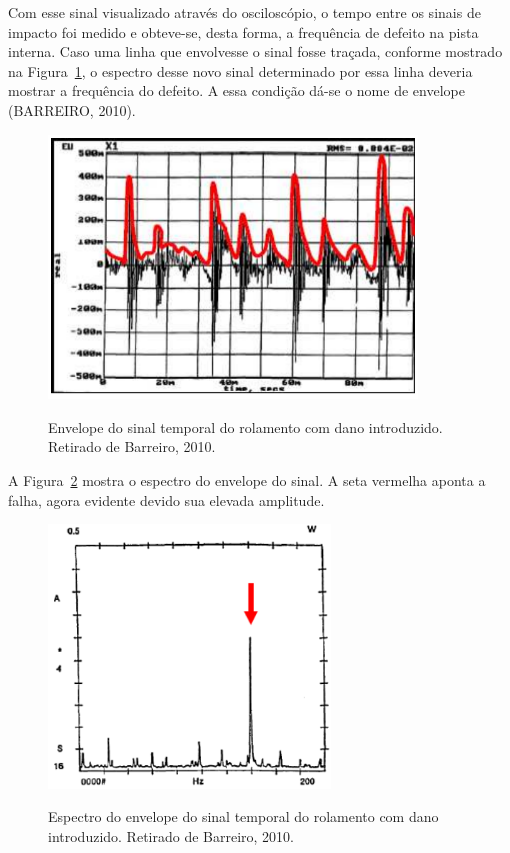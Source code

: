 \documentclass[
	12pt,				
	oneside,			
	a4paper,			
	english,			
	brazil,			
	]{abntex2ppgsi}
\begin{document}
Com esse sinal visualizado através do osciloscópio, o tempo entre os sinais de impacto foi medido e obteve-se, desta forma, a frequência de defeito na pista interna. Caso uma linha que envolvesse o sinal fosse traçada, conforme mostrado na Figura~\ref{sinal_envelope_rolamento_barreiro}, o espectro desse novo sinal determinado por essa linha deveria mostrar a frequência do defeito. A essa condição dá-se o nome de envelope (BARREIRO, 2010). 

\begin{figure}[H]
\centering
\caption {Envelope do sinal temporal do rolamento com dano introduzido. Retirado de Barreiro, 2010.}
\includegraphics[width=\textwidth,height=70mm,keepaspectratio]{sinal_envelope_rolamento_barreiro}
\label{sinal_envelope_rolamento_barreiro}
\end{figure}

A Figura~\ref{espectro_do_envelope_barreiro} mostra o espectro do envelope do sinal. A seta vermelha aponta a falha, agora evidente devido sua elevada amplitude.

\begin{figure}[H]
\centering
\caption {Espectro do envelope do sinal temporal do rolamento com dano introduzido. Retirado de Barreiro, 2010.}
\includegraphics[width=\textwidth,height=70mm,keepaspectratio]{espectro_do_envelope_barreiro}
\label{espectro_do_envelope_barreiro}
\end{figure}
\end{document}
